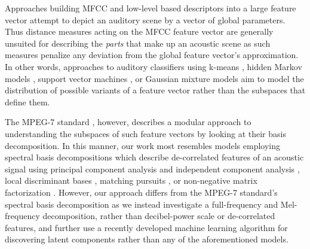 \documentclass[a4paper,11pt,final]{ThesisStyle}
\begin{document}



Approaches building MFCC and low-level based descriptors into a large feature vector attempt to depict an auditory scene by a vector of global parameters. Thus distance measures acting on the MFCC feature vector are generally unsuited for describing the \textit{parts} that make up an acoustic scene as such measures penalize any deviation from the global feature vector's approximation.  In other words, approaches to auditory classifiers using k-means \cite{Harma2005,Eronen2006,Allamanche2001}, hidden Markov models \cite{Eronen2006,Mesaros2010}, support vector machines \cite{Guo2003a}, or Gaussian mixture models \cite{Wang2011,Aucouturier2007a,Pampalk2006a} aim to model the distribution of possible variants of a feature vector rather than the subspaces that define them.  

The MPEG-7 standard \cite{Casey2001a,Manjunath2002}, however, describes a modular approach to understanding the subspaces of such feature vectors by looking at their basis decomposition.  In this manner, our work most resembles models employing spectral basis decompositions which describe de-correlated features of an acoustic signal using principal component analysis and independent component analysis \cite{Casey2001a,Xiong2003,Kim2004}, local discriminant bases \cite{Su2011}, matching pursuits \cite{Chu2009a}, or non-negative matrix factorization \cite{Raj2010}.  However, our approach differs from the MPEG-7 standard's spectral basis decomposition \cite{Casey2001a} as we instead investigate a full-frequency and Mel-frequency decomposition, rather than decibel-power scale or de-correlated features, and further use a recently developed machine learning algorithm for discovering latent components rather than any of the aforementioned models.
\end{document}
